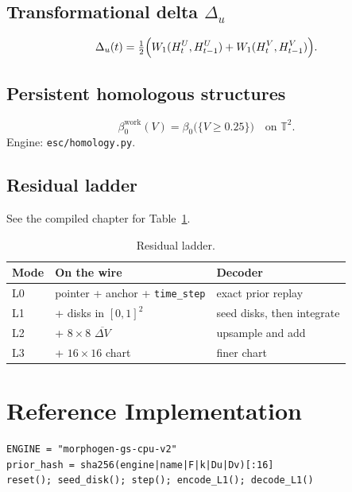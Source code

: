 \documentclass[12pt,oneside]{book}
\providecommand{\T}{\mathbb{T}}
\begin{document}
\subsection{Transformational delta \texorpdfstring{\(\Delta_u\)}{Delta u}}
\label{sec:delta}
\begin{equation}
  \label{eq:delta}
  \Delta_u(t)
  =\tfrac12\Bigl(
    W_1(H^U_t,H^U_{t-1})+W_1(H^V_t,H^V_{t-1})
  \Bigr).
\end{equation}

\subsection{Persistent homologous structures}
\label{sec:homology}
\begin{equation}
  \label{eq:beta0}
  \beta_0^{\mathrm{work}}(V)
  =\beta_0\bigl(\{V\ge 0.25\}\bigr)
  \quad\text{on }\T^2.
\end{equation}
Engine: \texttt{esc/homology.py}.

\subsection{Residual ladder}
\label{sec:ladder}
See the compiled chapter for Table~\ref{tab:ladder}.

\begin{table}[ht]
  \centering
  \caption{Residual ladder.}
  \label{tab:ladder}
  \begin{tabular}{@{}llp{}@{}}
    \toprule Mode & On the wire & Decoder \\
    \midrule
    L0 & pointer + anchor + \texttt{time\_step} & exact prior replay \\
    L1 & + disks in $[0,1]^2$ & seed disks, then integrate \\
    L2 & + $8\times 8$ $\overline{\Delta V}$ & upsample and add \\
    L3 & + $16\times 16$ chart & finer chart \\
    \bottomrule
  \end{tabular}
\end{table}

\section{Reference Implementation}
\label{sec:impl}

\begin{lstlisting}[caption={Minimal L1 sketch.},label={lst:l1}]
ENGINE = "morphogen-gs-cpu-v2"
prior_hash = sha256(engine|name|F|k|Du|Dv)[:16]
reset(); seed_disk(); step(); encode_L1(); decode_L1()
\end{lstlisting}
\end{document}
